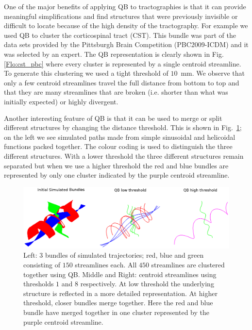 \documentclass{bioinfo}
\begin{document}
One of the major benefits of applying QB to tractographies is that it
can provide meaningful simplifications and find structures that were
previously invisible or difficult to locate because of the high density
of the tractography. For example we used QB to cluster the corticospinal
tract (CST). This bundle was part of the data sets provided by the
Pittsburgh Brain Competition (PBC2009-ICDM) and it was selected by an
expert. The QB representation is clearly shown in Fig.\ref{Flo:cst_pbc}
where every cluster is represented by a single centroid streamline. To
generate this clustering we used a tight threshold of $10$~mm. We
observe that only a few centroid streamlines travel the full distance
from bottom to top and that they are many streamlines that are broken
(i.e. shorter than what was initially expected) or highly divergent.

Another interesting feature of QB is that it can be used to merge or
split different structures by changing the distance threshold.  This is
shown in Fig.~\ref{Flo:simulated_orbits}; on the left we see simulated
paths made from simple sinusoidal and helicoidal functions packed
together. The colour coding is used to distinguish the three different
structures. With a lower threshold the three different structures remain
separated but when we use a higher threshold the red and blue bundles
are represented by only one cluster indicated by the purple centroid
streamline.

\begin{figure}
\begin{centering}
\includegraphics[scale=0.5]{Figures/Fig_5_helix_phantom}
\par\end{centering}
\caption{Left: $3$ bundles of simulated trajectories; red, blue and
  green consisting of $150$ streamlines each. All $450$ streamlines are
  clustered together using QB. Middle and Right: centroid streamlines
  using thresholds $1$ and $8$ respectively.  At low threshold the
  underlying structure is reflected in a more detailed
  representation. At higher threshold, closer bundles merge
  together. Here the red and blue bundle have merged together in one
  cluster represented by the purple centroid
  streamline.\label{Flo:simulated_orbits}}
\end{figure}
\end{document}
